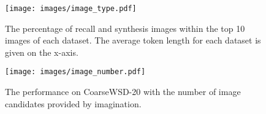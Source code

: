 \documentclass[11pt]{article}
\begin{document}
\begin{table}[!t]
\centering
{}
\caption{The performance of Z-LaVI (w/o LM) with different imagination methods. \# TOK is the average number of tokens of text inputs in each dataset. \xmark~means no image is provided to the model, and we only use the text encoder of CLIP. \textsc{Recall} and \textsc{Synthesis} represent using image search and image generation, respectively. \textsc{Both} means combining the two methods.}
\label{tab image method}
\end{table}
 \begin{figure}[!t]
\centering
    \texttt{[image: images/image\_type.pdf]}
    \caption{The percentage of recall and synthesis images within the top 10 images of each dataset. The average token length for each dataset is given on the x-axis.}
    \label{fig:image_type}
\end{figure}

\begin{figure}[!t]
\centering
    \texttt{[image: images/image\_number.pdf]}
    \caption{The performance on CoarseWSD-20 with the number of image candidates provided by imagination.}
    \label{fig:image_number}
\end{figure}
\end{document}
